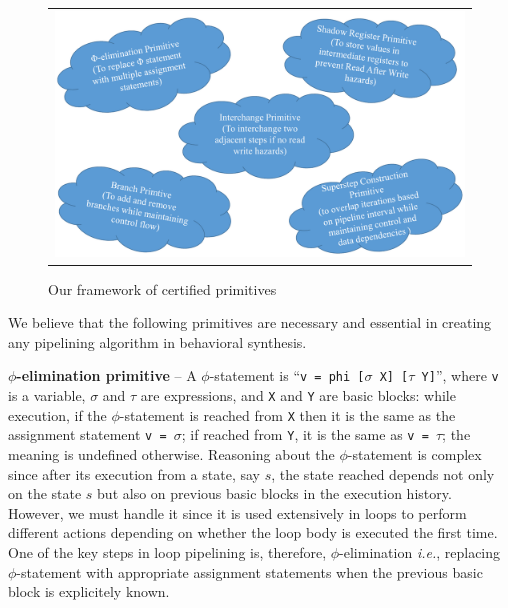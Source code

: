 \begin{figure}[t!]
\begin{center}
\begin{tabular}{c}
\includegraphics[width=5.5in]{fig-proposal/primitives}
\end{tabular}
\end{center}
\caption{Our framework of certified primitives}
\label{fig:primitives}
\end{figure}

We believe that the following primitives are necessary and essential in creating any pipelining
algorithm in behavioral synthesis.

{\textbf {$\phi$-elimination primitive}} -- A $\phi$-statement is ``{\tt v = phi
[$\sigma$ X] [$\tau$ Y]}'', where {\tt v} is a
variable, $\sigma$ and $\tau$ are expressions, and {\tt X}
and {\tt Y} are basic blocks: while execution, if the $\phi$-statement is
reached from {\tt X} then it
is the same as the assignment statement
{\tt v = $\sigma$}; if reached from {\tt Y}, it is the same as {\tt v = $\tau$};
the meaning is undefined otherwise.
Reasoning about the $\phi$-statement is complex since after its
execution from a state, say $s$, the state reached depends not only
on the state $s$ but also on previous basic blocks in the execution history.
However, we must handle it since it is used extensively in
loops to perform different actions depending on whether the
loop body is executed the first time. One of the key steps in loop pipelining is,
therefore, $\phi$-elimination {\em i.e.}, replacing
$\phi$-statement with appropriate assignment statements when the previous basic block is explicitely known.

